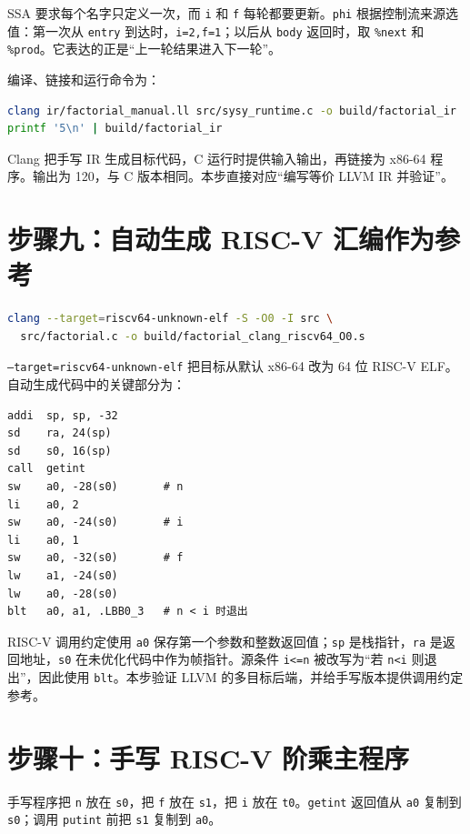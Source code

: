 \documentclass[UTF8,a4paper,12pt]{ctexart}
\begin{document}
SSA 要求每个名字只定义一次，而 \texttt{i} 和 \texttt{f} 每轮都要更新。\texttt{phi} 根据控制流来源选值：第一次从 \texttt{entry} 到达时，\texttt{i=2,f=1}；以后从 \texttt{body} 返回时，取 \texttt{\%next} 和 \texttt{\%prod}。它表达的正是“上一轮结果进入下一轮”。

编译、链接和运行命令为：

\begin{lstlisting}[language=bash]
clang ir/factorial_manual.ll src/sysy_runtime.c -o build/factorial_ir
printf '5\n' | build/factorial_ir
\end{lstlisting}

Clang 把手写 IR 生成目标代码，C 运行时提供输入输出，再链接为 x86-64 程序。输出为 120，与 C 版本相同。本步直接对应“编写等价 LLVM IR 并验证”。

\section{步骤九：自动生成 RISC-V 汇编作为参考}

\begin{lstlisting}[language=bash]
clang --target=riscv64-unknown-elf -S -O0 -I src \
  src/factorial.c -o build/factorial_clang_riscv64_O0.s
\end{lstlisting}

\texttt{--target=riscv64-unknown-elf} 把目标从默认 x86-64 改为 64 位 RISC-V ELF。自动生成代码中的关键部分为：

\begin{lstlisting}
addi  sp, sp, -32
sd    ra, 24(sp)
sd    s0, 16(sp)
call  getint
sw    a0, -28(s0)       # n
li    a0, 2
sw    a0, -24(s0)       # i
li    a0, 1
sw    a0, -32(s0)       # f
lw    a1, -24(s0)
lw    a0, -28(s0)
blt   a0, a1, .LBB0_3   # n < i 时退出
\end{lstlisting}

RISC-V 调用约定使用 \texttt{a0} 保存第一个参数和整数返回值；\texttt{sp} 是栈指针，\texttt{ra} 是返回地址，\texttt{s0} 在未优化代码中作为帧指针。源条件 \texttt{i<=n} 被改写为“若 \texttt{n<i} 则退出”，因此使用 \texttt{blt}。本步验证 LLVM 的多目标后端，并给手写版本提供调用约定参考。

\section{步骤十：手写 RISC-V 阶乘主程序}

手写程序把 \texttt{n} 放在 \texttt{s0}，把 \texttt{f} 放在 \texttt{s1}，把 \texttt{i} 放在 \texttt{t0}。\texttt{getint} 返回值从 \texttt{a0} 复制到 \texttt{s0}；调用 \texttt{putint} 前把 \texttt{s1} 复制到 \texttt{a0}。
\end{document}
